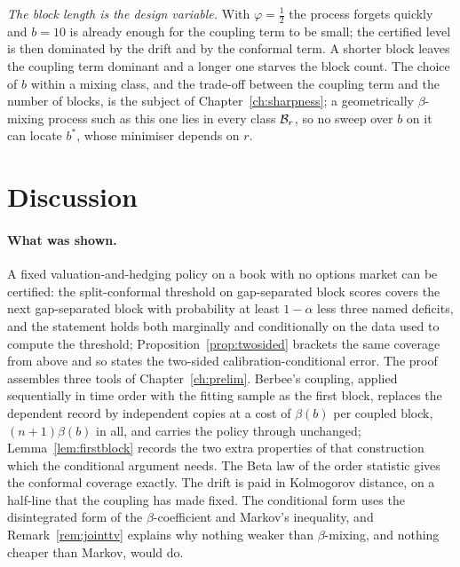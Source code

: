 \documentclass[../../../main.tex]{subfiles}
\begin{document}

\emph{The block length is the design variable.} With $\varphi=\tfrac12$ the process forgets quickly and $b=10$ is already enough for the coupling term to be small; the certified level is then dominated by the drift and by the conformal term. A shorter block leaves the coupling term dominant and a longer one starves the block count. The choice of $b$ within a mixing class, and the trade-off between the coupling term and the number of blocks, is the subject of Chapter~\ref{ch:sharpness}; a geometrically $\beta$-mixing process such as this one lies in every class $\mathcal B_{r}$, so no sweep over $b$ on it can locate $b^*$, whose minimiser depends on $r$.

\section{Discussion}\label{sec:cert-discussion}

\paragraph{What was shown.} A fixed valuation-and-hedging policy on a book with no options market can be certified: the split-conformal threshold on gap-separated block scores covers the next gap-separated block with probability at least $1-\alpha$ less three named deficits, and the statement holds both marginally and conditionally on the data used to compute the threshold; Proposition~\ref{prop:twosided} brackets the same coverage from above and so states the two-sided calibration-conditional error. The proof assembles three tools of Chapter~\ref{ch:prelim}. Berbee's coupling, applied sequentially in time order with the fitting sample as the first block, replaces the dependent record by independent copies at a cost of $\beta(b)$ per coupled block, $(n+1)\beta(b)$ in all, and carries the policy through unchanged; Lemma~\ref{lem:firstblock} records the two extra properties of that construction which the conditional argument needs. The Beta law of the order statistic gives the conformal coverage exactly. The drift is paid in Kolmogorov distance, on a half-line that the coupling has made fixed. The conditional form uses the disintegrated form of the $\beta$-coefficient and Markov's inequality, and Remark~\ref{rem:jointtv} explains why nothing weaker than $\beta$-mixing, and nothing cheaper than Markov, would do.
\end{document}
